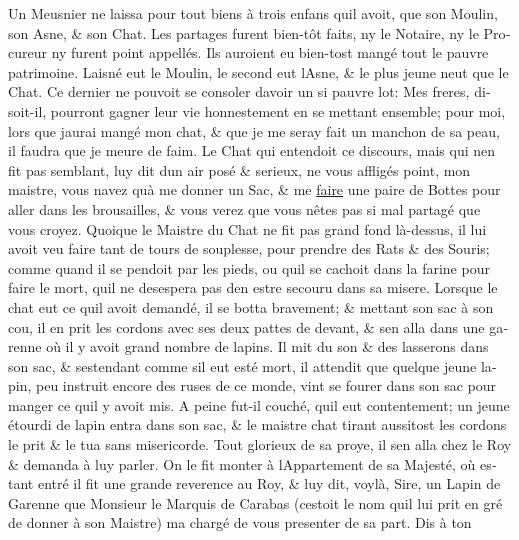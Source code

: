 \documentclass[14pt,a4paper]{memoir}
\newcommand{\ul}[1]{\uline{#1}}
\begin{document}
{{\begin{otherlanguage}{french}
Un Meusnier ne laissa pour tout biens à trois enfans
qu\textquotesingle il avoit, que son Moulin, son Asne, \& son Chat. Les
partages furent bien-tôt faits, ny le Notaire, ny le Procureur
n\textquotesingle y furent point appellés. Ils auroient eu bien-tost
mangé tout le pauvre patrimoine. L\textquotesingle aisné eut le Moulin,
le second eut l\textquotesingle Asne, \& le plus jeune
n\textquotesingle eut que le Chat. Ce dernier ne pouvoit se consoler
d\textquotesingle avoir un si pauvre lot: Mes freres, disoit-il,
pourront gagner leur vie honnestement en se mettant ensemble; pour moi,
lors que j\textquotesingle aurai mangé mon chat, \& que je me seray fait
un manchon de sa peau, il faudra que je meure de faim. Le Chat qui
entendoit ce discours, mais qui n\textquotesingle en fit pas semblant,
luy dit dun air posé \& serieux, ne vous affligés point, mon maistre,
vous n\textquotesingle avez qu\textquotesingle à me donner un Sac, \& me
\ul{faire} une paire de Bottes pour aller dans les brousailles, \& vous
verez que vous n\textquotesingle êtes pas si mal partagé que vous
croyez. Quoique le Maistre du Chat ne fit pas grand fond là-dessus, il
lui avoit veu faire tant de tours de souplesse, pour prendre des Rats \&
des Souris; comme quand il se pendoit par les pieds, ou
qu\textquotesingle il se cachoit dans la farine pour faire le mort,
qu\textquotesingle il ne desespera pas d\textquotesingle en estre
secouru dans sa misere. Lorsque le chat eut ce qu\textquotesingle il
avoit demandé, il se botta bravement; \& mettant son sac à son cou, il
en prit les cordons avec ses deux pattes de devant, \&
s\textquotesingle en alla dans une garenne où il y avoit grand nombre de
lapins. Il mit du son \& des lasserons dans son sac, \&
s\textquotesingle estendant comme s\textquotesingle il eut esté mort, il
attendit que quelque jeune lapin, peu instruit encore des ruses de ce
monde, vint se fourer dans son sac pour manger ce qu\textquotesingle il
y avoit mis. A peine fut-il couché, qu\textquotesingle il eut
contentement; un jeune étourdi de lapin entra dans son sac, \& le
maistre chat tirant aussitost les cordons le prit \& le tua sans
misericorde. Tout glorieux de sa proye, il s\textquotesingle en alla
chez le Roy \& demanda à luy parler. On le fit monter à
l\textquotesingle Appartement de sa Majesté, où estant entré il fit une
grande reverence au Roy, \& luy dit, voylà, Sire, un Lapin de Garenne
que Monsieur le Marquis de Carabas (c\textquotesingle estoit le nom
qu\textquotesingle il lui prit en gré de donner à son Maistre)
m\textquotesingle a chargé de vous presenter de sa part. Dis à ton

\end{otherlanguage}}}
\end{document}

